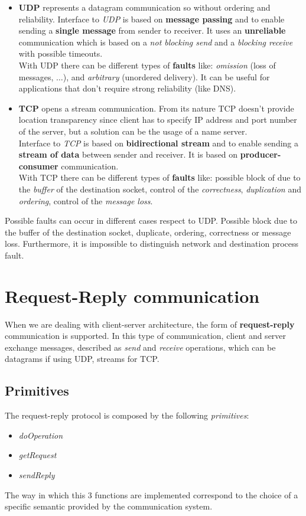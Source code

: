 \documentclass[11pt,a4paper]{article}
\begin{document}
\begin{itemize}
	\item \textbf{UDP} represents a datagram communication so without ordering and reliability. Interface to \textit{UDP} is based on \textbf{message passing} and to enable sending a \textbf{single message} from sender to receiver. It uses an \textbf{unreliable} communication which is based on a \textit{not blocking send} and a \textit{blocking receive} with possible timeouts.\\
	With UDP there can be different types of \textbf{faults} like: \textit{omission} (loss of messages, $\dots$), and \textit{arbitrary} (unordered delivery). It can be useful for applications that don't require strong reliability (like DNS).
	\item \textbf{TCP} opens a stream communication. From its nature TCP doesn't provide location transparency since client has to specify IP address and port number of the server, but a solution can be the usage of a name server.\\
	Interface to \textit{TCP} is based on \textbf{bidirectional stream} and to enable sending a \textbf{stream of data} between sender and receiver. It is based on \textbf{producer-consumer} communication.\\
	With TCP there can be different types of \textbf{faults} like: possible block of due to the \textit{buffer} of the destination socket, control of the \textit{correctness}, \textit{duplication} and \textit{ordering}, control of the \textit{message loss}.
\end{itemize}
Possible faults can occur in different cases respect to UDP. Possible block due to the buffer of the destination socket, duplicate, ordering, correctness or message loss. Furthermore, it is impossible to distinguish network and destination process fault. 

\section{Request-Reply communication}
When we are dealing with client-server architecture, the form of \textbf{request-reply} communication is supported. In this type of communication, client and server exchange messages, described as \textit{send} and \textit{receive} operations, which can be datagrams if using UDP, streams for TCP.

\subsection{Primitives} 
The request-reply protocol is composed by the following \textit{primitives}:
\begin{itemize}
	\item \textit{doOperation}
	\item \textit{getRequest}
	\item \textit{sendReply}
\end{itemize}
The way in which this 3 functions are implemented correspond to the choice of a specific semantic provided by the communication system.
 
\end{document}
